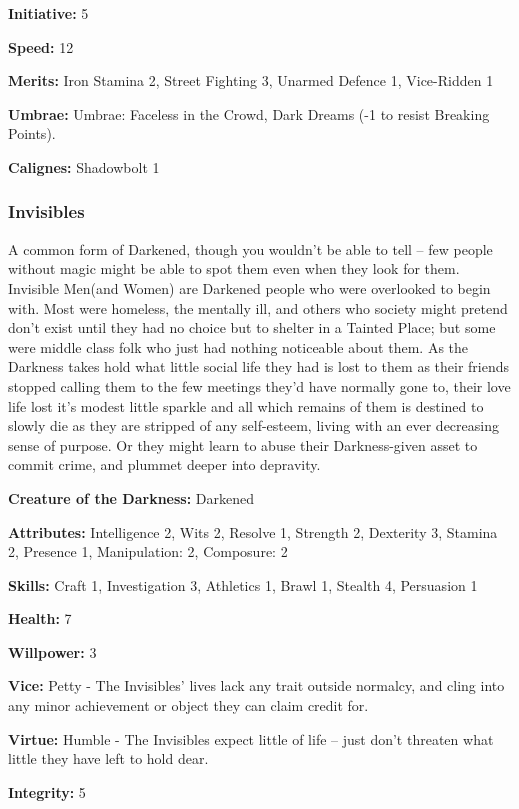 \noindent \textbf{Initiative:} 5

\noindent \textbf{Speed:} 12

\noindent \textbf{Merits:} Iron Stamina 2, Street Fighting 3, Unarmed Defence 1, Vice-Ridden 1

\noindent \textbf{Umbrae:} Umbrae: Faceless in the Crowd, Dark Dreams (-1 to resist Breaking Points).

\noindent \textbf{Calignes:} Shadowbolt 1 

\subsubsection*{Invisibles}
A common form of Darkened, though you wouldn’t be able to tell – few people without magic might be able to spot them even when they look for them. Invisible Men(and Women) are Darkened people who were overlooked to begin with. Most were homeless, the mentally ill, and others who society might pretend don't exist until they had no choice but to shelter in a Tainted Place; but some were middle class folk who just had nothing noticeable about them. As the Darkness takes hold what little social life they had is lost to them as their friends stopped calling them to the few meetings they’d have normally gone to, their love life lost it’s modest little sparkle and all which remains of them is destined to slowly die as they are stripped of any self-esteem, living with an ever decreasing sense of purpose. Or they might learn to abuse their Darkness-given asset to commit crime, and plummet deeper into depravity.

\noindent \textbf{Creature of the Darkness:} Darkened

\noindent \textbf{Attributes:} Intelligence 2, Wits 2, Resolve 1, Strength 2, Dexterity 3, Stamina 2, Presence 1, Manipulation: 2, Composure: 2

\noindent \textbf{Skills:} Craft 1, Investigation 3, Athletics 1, Brawl 1, Stealth 4, Persuasion 1

\noindent \textbf{Health:} 7

\noindent \textbf{Willpower:} 3

\noindent \textbf{Vice:} Petty - The Invisibles’ lives lack any trait outside normalcy, and cling into any minor achievement or object they can claim credit for.

\noindent \textbf{Virtue:}  Humble - The Invisibles expect little of life – just don’t threaten what little they have left to hold dear.

\noindent \textbf{Integrity:} 5

